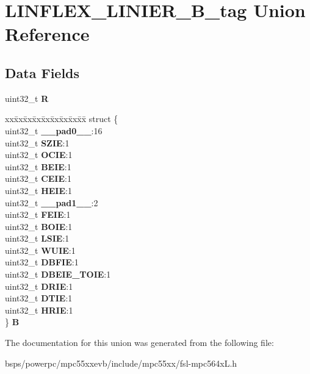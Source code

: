 \hypertarget{unionLINFLEX__LINIER__32B__tag}{}\section{L\+I\+N\+F\+L\+E\+X\+\_\+\+L\+I\+N\+I\+E\+R\+\_\+B\+\_\+tag Union Reference}
\label{unionLINFLEX__LINIER__32B__tag}
\subsection*{Data Fields}
\begin{DoxyCompactItemize}
\item 
\mbox{\label{unionLINFLEX__LINIER__32B__tag_a5d59c212fc5f5d5a2d11543bc77bb780}} 
uint32\+\_\+t {\bfseries R}
\item 
\mbox{\label{unionLINFLEX__LINIER__32B__tag_aeb4eec805c4e60a4c1a8b1ad855f9c56}} 
\begin{tabbing}
xx\=xx\=xx\=xx\=xx\=xx\=xx\=xx\=xx\=\kill
struct \{\\
\>uint32\_t {\bfseries \_\_pad0\_\_}:16\\
\>uint32\_t {\bfseries SZIE}:1\\
\>uint32\_t {\bfseries OCIE}:1\\
\>uint32\_t {\bfseries BEIE}:1\\
\>uint32\_t {\bfseries CEIE}:1\\
\>uint32\_t {\bfseries HEIE}:1\\
\>uint32\_t {\bfseries \_\_pad1\_\_}:2\\
\>uint32\_t {\bfseries FEIE}:1\\
\>uint32\_t {\bfseries BOIE}:1\\
\>uint32\_t {\bfseries LSIE}:1\\
\>uint32\_t {\bfseries WUIE}:1\\
\>uint32\_t {\bfseries DBFIE}:1\\
\>uint32\_t {\bfseries DBEIE\_TOIE}:1\\
\>uint32\_t {\bfseries DRIE}:1\\
\>uint32\_t {\bfseries DTIE}:1\\
\>uint32\_t {\bfseries HRIE}:1\\
\} {\bfseries B}\\

\end{tabbing}\end{DoxyCompactItemize}


The documentation for this union was generated from the following file\+:\begin{DoxyCompactItemize}
\item 
bsps/powerpc/mpc55xxevb/include/mpc55xx/fsl-\/mpc564x\+L.\+h\end{DoxyCompactItemize}
